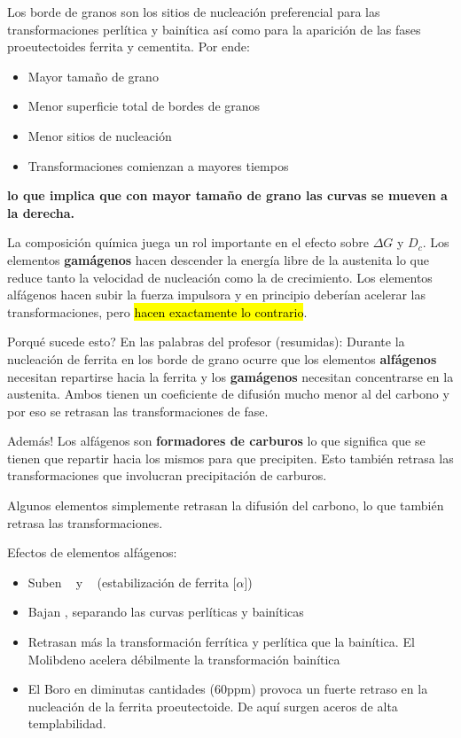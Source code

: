 Los borde de granos son los sitios de nucleación preferencial para las transformaciones perlítica y bainítica así como para la aparición de las fases proeutectoides ferrita y cementita. Por ende:
\begin{itemize}
    \item Mayor tamaño de grano \goright
    \item[\goright] Menor superficie total de bordes de granos \goright
    \item[\goright] Menor sitios de nucleación \goright
    \item[\goright] Transformaciones comienzan a mayores tiempos
\end{itemize}
\textbf{lo que implica que con mayor tamaño de grano las curvas se mueven a la derecha.}

La composición química juega un rol importante en el efecto sobre $\Delta G$ y $D_c$. Los elementos \textbf{gamágenos} hacen descender la energía libre de la austenita lo que reduce tanto la velocidad de nucleación como la de crecimiento. Los elementos alfágenos hacen subir la fuerza impulsora y en principio deberían acelerar las transformaciones, pero \hl{hacen exactamente lo contrario}.

Porqué sucede esto? En las palabras del profesor (resumidas): Durante la nucleación de ferrita en los borde de grano ocurre que los elementos \textbf{alfágenos} necesitan repartirse hacia la ferrita y los \textbf{gamágenos} necesitan concentrarse en la austenita. Ambos tienen un coeficiente de difusión mucho menor al del carbono y por eso se retrasan las transformaciones de fase.

Además! Los alfágenos son \textbf{formadores de carburos} lo que significa que se tienen que repartir hacia los mismos para que precipiten. Esto también retrasa las transformaciones que involucran precipitación de carburos. 

Algunos elementos simplemente retrasan la difusión del carbono, lo que también retrasa las transformaciones.

Efectos de elementos alfágenos:
\begin{itemize}
    \item Suben \Aone~ y \Athree~ (estabilización de ferrita [$\alpha$])
    \item Bajan \Bs, separando las curvas perlíticas y bainíticas
    \item Retrasan más la transformación ferrítica y perlítica que la bainítica. El Molibdeno acelera débilmente la transformación bainítica
    \item El Boro en diminutas cantidades (60ppm) provoca un fuerte retraso en la nucleación de la ferrita proeutectoide. De aquí surgen aceros de alta templabilidad.
\end{itemize}

